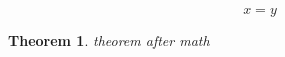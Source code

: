 \documentclass{article}
\newtheorem{theorem}{Theorem}
\begin{document}
$$ x=y $$
\begin{theorem}
	theorem after math
\end{theorem}

\end{document}

